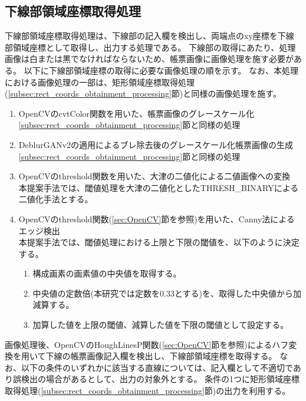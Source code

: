 \subsection{下線部領域座標取得処理}\label{subsec:underline_coords_obtainment_processing}
下線部領域座標取得処理は、下線部の記入欄を検出し、両端点のxy座標を下線部領域座標として取得し、出力する処理である。
下線部の取得にあたり、処理画像は白または黒でなければならないため、帳票画像に画像処理を施す必要がある。
以下に下線部領域座標の取得に必要な画像処理の順を示す。
なお、本処理における画像処理の一部は、矩形領域座標取得処理(\ref{subsec:rect_coords_obtainment_processing}節)と同様の画像処理を施す。

\begin{enumerate}
    \item OpenCVのcvtColor関数を用いた、帳票画像のグレースケール化\\
        \ref{subsec:rect_coords_obtainment_processing}節と同様の処理
    \item DeblurGANv2の適用によるブレ除去後のグレースケール化帳票画像の生成\\
        \ref{subsec:rect_coords_obtainment_processing}節と同様の処理
    \item OpenCVのthreshold関数を用いた、大津の二値化による二値画像への変換\\
        本提案手法では、閾値処理を大津の二値化としたTHRESH\_BINARYによる二値化手法とする。
    \item OpenCVのthreshold関数(\ref{sec:OpenCV}節を参照)を用いた、Canny法によるエッジ検出\\
        本提案手法では、閾値処理における上限と下限の閾値を、以下のように決定する。
        \begin{enumerate}
            \item 構成画素の画素値の中央値を取得する。
            \item 中央値の定数倍(本研究では定数を0.33とする)を、取得した中央値から加減算する。
            \item 加算した値を上限の閾値、減算した値を下限の閾値として設定する。
        \end{enumerate}
\end{enumerate}

画像処理後、OpenCVのHoughLinesP関数(\ref{sec:OpenCV}節を参照)によるハフ変換を用いて下線の帳票画像記入欄を検出し、下線部領域座標を取得する。
なお、以下の条件のいずれかに該当する直線については、記入欄として不適切であり誤検出の場合があるとして、出力の対象外とする。
条件の1つに矩形領域座標取得処理(\ref{subsec:rect_coords_obtainment_processing}節)の出力を利用する。

